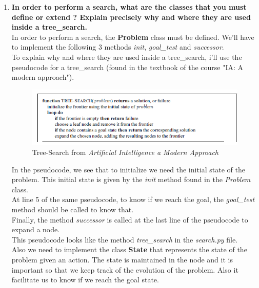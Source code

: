 \documentclass[10pt,a4paper]{article}
\begin{document}
\begin{enumerate}
	\item \textbf{In order to perform a search, what are the classes that you must define or extend ? Explain precisely why and where they are used inside a tree\_search.} \\

	
	In order to perform a search, the \textbf{Problem} class must be defined. We'll have to implement the following 3 methods  \textit{init}, \textit{goal\_test} and \textit{successor}. \\
	To explain why and where they are used inside a tree\_search, i'll use the pseudocode for a tree\_search (found in the textbook of the course "IA: A modern approach").\\
	
		
\begin{figure}[!h] %
\includegraphics{Tree-Search.png} %
\caption{Tree-Search from \textit{Artificial Intelligence a Modern Approach}} %
\label{image_soleil} %
\end{figure} %
	
	In the pseudocode, we see that to initialize we need the initial state of the problem. This initial state is given by the \textit{init} method found in the \textit{Problem} class.\\
	At line 5 of the same pseudocode, to know if we reach the goal, the \textit{goal\_test} method should be called to know that.\\
	Finally, the method \textit{successor} is called at the last line of the pseudocode to expand a node.\\
	
	This pseudocode looks like the method \textit{tree\_search} in the \textit{search.py} file.\\
	
	Also we need to implement the class \textbf{State} that represents the state of the problem given an action. The state is maintained in the node and it is important so that we keep track of the evolution of the problem. Also it facilitate us to know if we reach the goal state. \\
	

\end{enumerate}
\end{document}
